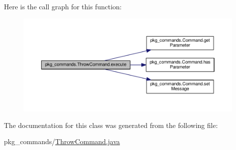 Here is the call graph for this function\-:\nopagebreak
\begin{figure}[H]
\begin{center}
\leavevmode
\includegraphics[width=350pt]{classpkg__commands_1_1ThrowCommand_a38d936bcebcf45936324caf0f417b012_cgraph}
\end{center}
\end{figure}




The documentation for this class was generated from the following file\-:\begin{DoxyCompactItemize}
\item 
pkg\-\_\-commands/\hyperlink{ThrowCommand_8java}{Throw\-Command.\-java}\end{DoxyCompactItemize}
